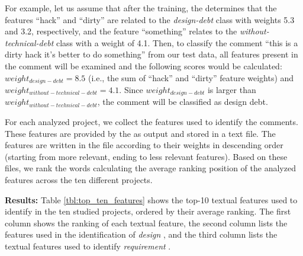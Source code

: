 For example, let us assume that after the training, the  determines that the features ``hack'' and ``dirty'' are related to the \textit{design-debt} class with weights 5.3 and 3.2, respectively, and the feature ``something'' relates to the \textit{without-technical-debt} class with a weight of 4.1. Then, to classify the comment ``this is a dirty hack it's better to do something'' from our test data, all features present in the comment will be examined and the following scores would be calculated: $weight_{design-debt}=8.5$ (i.e., the sum of ``hack'' and ``dirty'' feature weights) and  $weight_{without-technical-debt}=4.1$.
Since $weight_{design-debt}$ is larger than $weight_{without-technical-debt}$, the comment will be classified as design debt.

For each analyzed project, we collect the features used to identify the \SATD comments. These features are provided by the  as output and stored in a text file. The features are written in the file according to their weights in descending order (starting from more relevant, ending to less relevant features). Based on these files, we rank the words calculating the average ranking position of the analyzed features across the ten different projects. 

\noindent \textbf{Results:} Table \ref{tbl:top_ten_features} shows the top-10 textual features used to identify  \SATD in the ten studied projects, ordered by their average ranking. The first column shows the ranking of each textual feature, the second column lists the features used in the identification of \emph{design} \SATD, and the third column lists the textual features used to identify \emph{requirement} \SATD.

